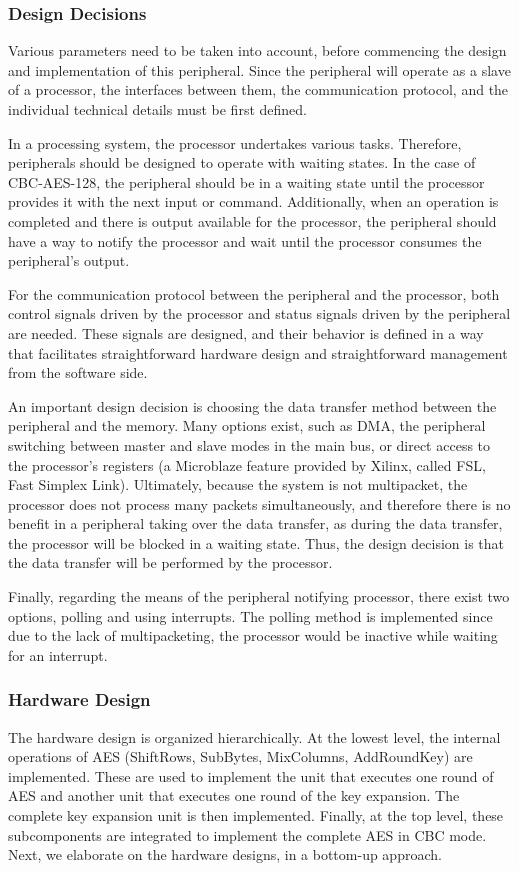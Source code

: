 \subsubsection*{Design Decisions}
Various parameters need to be taken into account, before commencing the design and implementation of this peripheral. Since the peripheral will operate as a slave of a processor, the interfaces between them, the communication protocol, and the individual technical details must be first defined.

In a processing system, the processor undertakes various tasks. Therefore, peripherals should be designed to operate with waiting states. In the case of CBC-AES-128, the peripheral should be in a waiting state until the processor provides it with the next input or command. Additionally, when an operation is completed and there is output available for the processor, the peripheral should have a way to notify the processor and wait until the processor consumes the peripheral's output.

For the communication protocol between the peripheral and the processor, both control signals driven by the processor and status signals driven by the peripheral are needed. These signals are designed, and their behavior is defined in a way that facilitates straightforward hardware design and straightforward management from the software side.

An important design decision is choosing the data transfer method between the peripheral and the memory. Many options exist, such as DMA, the peripheral switching between master and slave modes in the main bus, or direct access to the processor's registers (a Microblaze feature provided by Xilinx, called FSL, Fast Simplex Link). Ultimately, because the system is not multipacket, the processor does not process many packets simultaneously, and therefore there is no benefit in a peripheral taking over the data transfer, as during the data transfer, the processor will be blocked in a waiting state. Thus, the design decision is that the data transfer will be performed by the processor.

Finally, regarding the means of the peripheral notifying processor, there exist two options, polling and using interrupts. The polling method is implemented since due to the lack of multipacketing, the processor would be inactive while waiting for an interrupt.


\subsubsection*{Hardware Design}
The hardware design is organized hierarchically. At the lowest level, the internal operations of AES (ShiftRows, SubBytes, MixColumns, AddRoundKey) are implemented. These are used to implement the unit that executes one round of AES and another unit that executes one round of the key expansion. The complete key expansion unit is then implemented. Finally, at the top level, these subcomponents are integrated to implement the complete AES in CBC mode. Next, we elaborate on the hardware designs, in a bottom-up approach.

